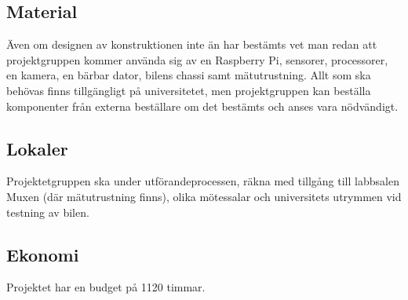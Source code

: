 \documentclass[projektplan/plan.tex]{subfiles}
\begin{document}
\subsection{Material}
Även om designen av konstruktionen inte än har bestämts vet man redan att
projektgruppen kommer använda sig av en Raspberry Pi, sensorer, processorer, en
kamera, en bärbar dator, bilens chassi samt mätutrustning. Allt som ska
behövas finns tillgängligt på universitetet, men projektgruppen kan beställa
komponenter från externa beställare om det bestämts och anses vara nödvändigt.

\subsection{Lokaler}
Projektetgruppen ska under utförandeprocessen, räkna med tillgång till
labbsalen Muxen (där mätutrustning finns), olika mötessalar och universitets
utrymmen vid testning av bilen.

\subsection{Ekonomi}
Projektet har en budget på 1120 timmar.
\end{document}
